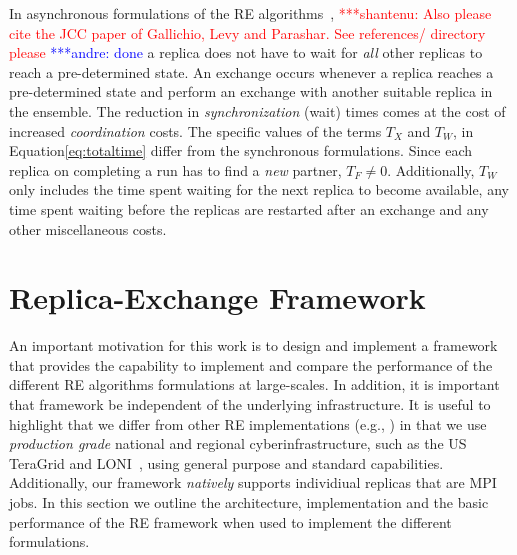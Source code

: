 \documentclass{rspublic}
\newcommand{\jhanote}[1]{ {\textcolor{red} { ***shantenu: #1 }}}
\newcommand{\alnote}[1]{ {\textcolor{blue} { ***andre: #1 }}}
\newcommand{\athotanote}[1]{ {\textcolor{green} { ***athota: #1 }}}
\newcommand{\alnote}[1]{}
\newcommand{\athotanote}[1]{}
\newcommand{\jhanote}[1]{}
\begin{document}
In asynchronous formulations of the RE algorithms~\citep{parashar_arepex,DBLP:journals/jcc/GallicchioLP08},  \jhanote{Also please
  cite the JCC paper of Gallichio, Levy and Parashar. See references/
  directory please}\alnote{done} a replica does not have to wait for {\it all}
other replicas to reach a pre-determined state. An exchange occurs
whenever a replica reaches a pre-determined state and perform an
exchange with another suitable replica in the ensemble.  The reduction
in {\it synchronization} (wait) times comes at the cost of increased
{\it coordination} costs.  The specific values of the terms $T_{X}$
and $T_W$, in Equation\ref{eq:totaltime} differ from the synchronous
formulations.  Since each replica on completing a run has to find a
{\it new} partner, $T_F \neq 0$.  Additionally, $T_W$ only includes
the time spent waiting for the next replica to become available, any
time spent waiting before the replicas are restarted after an exchange
and any other miscellaneous costs.




\section{Replica-Exchange Framework}\label{repexfw}

An important motivation for this work is to design and implement a
framework that provides the capability to implement and compare the
performance of the different RE algorithms formulations at
large-scales.  In addition, it is important that framework be
independent of the underlying infrastructure.  It is useful to
highlight that we differ from other RE implementations (e.g.,
\citep{parashar_arepex}) in that we use {\it production grade}
national and regional cyberinfrastructure, such as the US TeraGrid and
LONI~\citep{LONI_web}, using general purpose and standard
capabilities.  Additionally, our framework {\it natively} supports
individiual replicas that are MPI jobs. In this section we outline the
architecture, implementation and the basic performance of the RE
framework when used to implement the different formulations.
\end{document}
